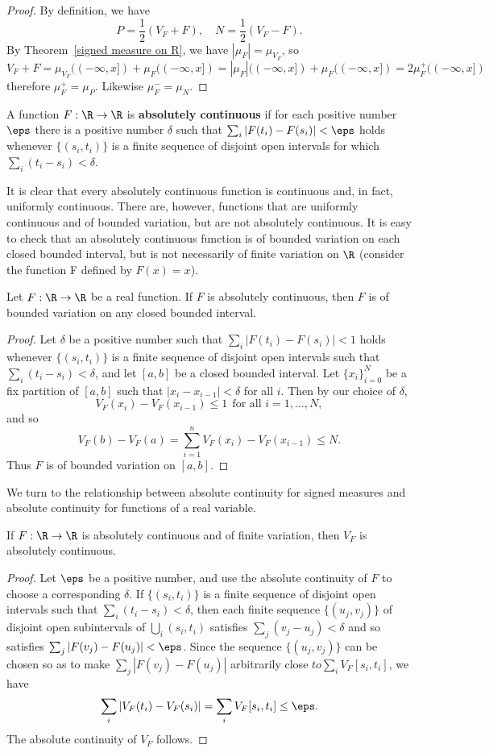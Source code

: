 \begin{proof}
By definition, we have
\[P=\frac{1}{2}(V_F+F),\quad N=\frac{1}{2}(V_F-F).\]
By Theorem~\ref{signed measure on R}, we have $|\mu_F|=\mu_{V_F}$, so
\[V_F+F=\mu_{V_F}((-\infty,x])+\mu_F((-\infty,x])=|\mu_F|((-\infty,x])+\mu_F((-\infty,x])=2\mu_F^+((-\infty,x])\]
therefore $\mu_F^+=\mu_P$. Likewise $\mu_F^-=\mu_N$.
\end{proof}
A function $F:\R\to\R$ is \textbf{absolutely continuous} if for each positive number $\eps$ there is a positive number $\delta$ such that $\sum_i|F(t_i)-F(s_i)|<\eps$ holds whenever $\{(s_i,t_i)\}$ is a
finite sequence of disjoint open intervals for which $\sum_i(t_i-s_i)<\delta$.\par
It is clear that every absolutely continuous function is continuous and, in fact, uniformly continuous. There are, however, functions that are uniformly continuous and of bounded variation, but are not absolutely continuous. It is easy to check that an absolutely continuous function is of bounded variation on each closed bounded interval, but is not necessarily of finite variation on $\R$ (consider the function F defined by $F(x)=x$).
\begin{proposition}\label{absolutely continuous is BV on closed interval}
Let $F:\R\to\R$ be a real function. If $F$ is absolutely continuous, then $F$ is of bounded variation on any closed bounded interval.
\end{proposition}
\begin{proof}
Let $\delta$ be a positive number such that $\sum_i|F(t_i)-F(s_i)|<1$ holds whenever $\{(s_i,t_i)\}$ is a finite sequence of disjoint open intervals such that $\sum_i(t_i-s_i)<\delta$, and let $[a,b]$ be a closed bounded interval. Let $\{x_i\}_{i=0}^{N}$ be a fix partition of $[a,b]$ such that $|x_{i}-x_{i-1}|<\delta$ for all $i$. Then by our choice of $\delta$,
\[V_F(x_i)-V_F(x_{i-1})\leq 1\ \ \text{for all $i=1,\dots,N$},\]
and so
\[V_F(b)-V_F(a)=\sum_{i=1}^{n}V_F(x_i)-V_F(x_{i-1})\leq N.\]
Thus $F$ is of bounded variation on $[a,b]$.
\end{proof}
We turn to the relationship between absolute continuity for signed measures and absolute continuity for functions of a real variable.
\begin{lemma}\label{absolutely continuous variation is}
If $F:\R\to\R$ is absolutely continuous and of finite variation, then $V_F$ is absolutely continuous.
\end{lemma}
\begin{proof}
Let $\eps$ be a positive number, and use the absolute continuity of $F$ to choose a corresponding $\delta$. If $\{(s_i,t_i)\}$ is a finite sequence of disjoint open intervals such that $\sum_i(t_i-s_i)<\delta$, then each finite sequence $\{(u_j,v_j)\}$ of disjoint open subintervals of $\bigcup_i(s_i,t_i)$ satisfies $\sum_j(v_j-u_j)<\delta$ and so satisfies $\sum_j|F(v_j)-F(u_j)|<\eps$. Since the sequence $\{(u_j,v_j)\}$ can be chosen so as to make $\sum_j|F(v_j)-F(u_j)|$ arbitrarily close $to \sum_iV_F[s_i,t_i]$, we have
\[\sum_i|V_F(t_i)-V_F(s_i)|=\sum_iV_F[s_i,t_i]\leq\eps.\]
The absolute continuity of $V_F$ follows.
\end{proof}
